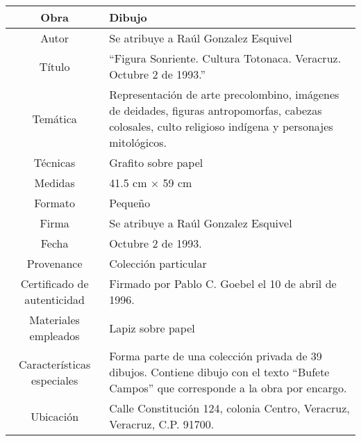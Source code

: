 \begin{table}[H]
\centering
\begin{tabular}{|c|m{}|}
\hline
Obra& Dibujo	\\
\hline
Autor & Se atribuye a Ra\'ul Gonzalez Esquivel\\
\hline
T\'itulo & ``Figura Sonriente. Cultura Totonaca. Veracruz. Octubre 2 de 1993.'' \\
\hline
Tem\'atica & Representaci\'on de arte precolombino, im\'agenes de deidades, figuras antropomorfas, cabezas colosales, culto religioso ind\'igena y personajes mitol\'ogicos.\\
\hline
T\'ecnicas &Grafito sobre papel \\
\hline
Medidas & 41.5 cm $\times$ 59 cm \\
\hline
 Formato & Peque\~no \\
 \hline
 Firma & Se atribuye a Ra\'ul Gonzalez Esquivel\\ 
 \hline
  Fecha & Octubre 2 de 1993.\\
 \hline
 Provenance & Colecci\'on particular\\
 \hline
 Certificado de autenticidad& Firmado por Pablo C. Goebel el 10 de abril de 1996.  \\
 \hline 
  Materiales empleados & Lapiz sobre papel\\
 \hline
 Caracter\'isticas especiales & Forma parte de una colecci\'on privada de 39 dibujos. 
Contiene dibujo con el texto ``Bufete Campos'' que corresponde a la obra por encargo. \\
\hline 
Ubicaci\'on & Calle Constituci\'on 124, colonia Centro, Veracruz, Veracruz, C.P. 91700.\\
\hline

\end{tabular}
\end{table}

